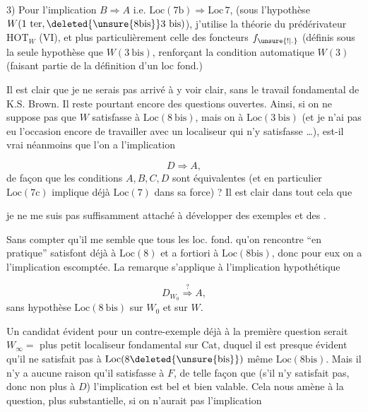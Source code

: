 3) Pour l'implication $B\Rightarrow A$ i.e. $\mathrm{Loc}(7\mathrm b)\Rightarrow \mathrm{Loc}\,7$, (sous l'hypothèse $W(1\ \mathrm{ter},\deleted{\unsure{8\mathrm{bis}}}3\ \mathrm{bis})$), j'utilise la théorie du prédérivateur $\mathrm{HOT}_W$ (VI), et plus particulièrement celle des foncteurs $f_{\unsure{!|.}}$ (définis sous la seule hypothèse que  $W(3\ \mathrm{bis})$, renforçant la condition automatique $W(3)$ (faisant partie de la définition d'un loc fond.)

Il est clair que je ne serais pas arrivé à y voir clair, sans le travail fondamental de K.S. Brown. Il reste pourtant encore des questions ouvertes. Ainsi, si on ne suppose pas que $W$ satisfasse à $\mathrm{Loc}(8\ \mathrm{bis})$, mais on  à $\mathrm{Loc}(3\ \mathrm{bis})$ (et je n'ai pas eu l'occasion encore de travailler avec un localiseur qui n'y satisfasse \ldots), est-il vrai néanmoins que l'on a  l'implication

\[
 D\Longrightarrow A,
\]
de façon que les conditions $A,B,C,D$ sont équivalentes (et en particulier $\mathrm{Loc}(7\mathrm c)$ implique déjà $\mathrm{Loc}(7)$ dans  sa force) ? Il est clair dans tout cela que

je ne me suis pas suffisamment attaché à développer des exemples et des .

Sans compter qu'il me semble que tous les loc. fond.  qu'on rencontre ``en pratique'' satisfont déjà à $\mathrm{Loc}(8)$ et a fortiori à $\mathrm{Loc}(8\mathrm{bis})$, donc pour eux on a  l'implication escomptée. La  remarque s'applique à l'implication hypothétique

\[
 D_{W_0}\overset{?}{\Longrightarrow}A,
\]
sans hypothèse $\mathrm{Loc}(8\ \mathrm{bis})$ sur $W_0$ et sur $W$.

 Un candidat évident pour un contre-exemple déjà à la première question serait $W_\infty={}$ plus petit localiseur fondamental sur $\mathrm{Cat}$, duquel il est presque évident qu'il ne satisfait pas à $\mathrm{Loc}(8\deleted{\unsure{\mathrm{bis}}})$  même $\mathrm{Loc}(8\mathrm{bis})$. Mais il n'y a aucune raison qu'il satisfasse  à $F$,  de telle façon que (s'il n'y satisfait pas\unsure{\deleted{)}|)}, donc non plus à $D$) l'implication  est bel et bien valable. Cela nous amène à la question, plus substantielle, si on n'aurait pas  l'implication

